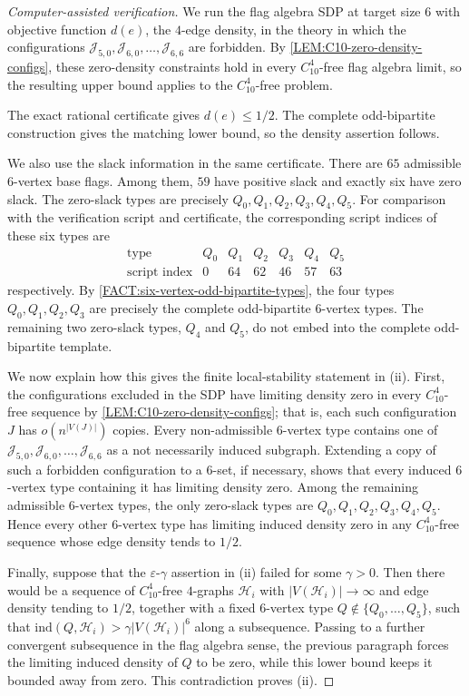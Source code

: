 \documentclass[10pt,a4paper]{article}
\theoremstyle{plain}
\theoremstyle{definition}
\newcommand{\ind}{\mathrm{ind}}
\begin{document}
\begin{proof}[Computer-assisted verification]
We run the flag algebra SDP at target size $6$ with objective function $d(e)$, the $4$-edge density, in the theory in which the configurations $\mathcal J_{5,0}, \mathcal J_{6,0},\ldots,\mathcal J_{6,6}$ are forbidden.  By \cref{LEM:C10-zero-density-configs}, these zero-density constraints hold in every $C_{10}^4$-free flag algebra limit, so the resulting upper bound applies to the $C_{10}^4$-free problem.

The exact rational certificate gives $d(e) \le 1/2$.
The complete odd-bipartite construction gives the matching lower bound, so the density assertion follows.

We also use the slack information in the same certificate.  There are $65$ admissible $6$-vertex base flags.  Among them, $59$ have positive slack and exactly six have zero slack.  The zero-slack types are precisely
$Q_0,Q_1,Q_2,Q_3,Q_4,Q_5$.
For comparison with the verification script and certificate, the corresponding script indices of these six types are
\[
\begin{array}{c|cccccc}
\text{type} & Q_0 & Q_1 & Q_2 & Q_3 & Q_4 & Q_5\\
\hline
\text{script index} & 0 & 64 & 62 & 46 & 57 & 63
\end{array}
\]
respectively.
By \cref{FACT:six-vertex-odd-bipartite-types}, the four types $Q_0,Q_1,Q_2,Q_3$ are precisely the complete odd-bipartite $6$-vertex types.
The remaining two zero-slack types, $Q_4$ and $Q_5$, do not embed into the complete odd-bipartite template.

We now explain how this gives the finite local-stability statement in \textup{(ii)}.  First, the configurations excluded in the SDP have limiting density zero in every $C_{10}^4$-free sequence by \cref{LEM:C10-zero-density-configs}; that is, each such configuration $J$ has $o(n^{|V(J)|})$ copies.  Every non-admissible $6$-vertex type contains one of $\mathcal J_{5,0},\mathcal J_{6,0},\ldots,\mathcal J_{6,6}$ as a not necessarily induced subgraph.  Extending a copy of such a forbidden configuration to a $6$-set, if necessary, shows that every induced $6$-vertex type containing it has limiting density zero.  Among the remaining admissible $6$-vertex types, the only zero-slack types are $Q_0,Q_1,Q_2,Q_3,Q_4,Q_5$.  Hence every other $6$-vertex type has limiting induced density zero in any $C_{10}^4$-free sequence whose edge density tends to $1/2$.

Finally, suppose that the $\varepsilon$-$\gamma$ assertion in \textup{(ii)} failed for some $\gamma>0$.  Then there would be a sequence of $C_{10}^4$-free $4$-graphs $\mathcal H_i$ with $|V(\mathcal H_i)|\to\infty$ and edge density tending to $1/2$, together with a fixed $6$-vertex type $Q\notin\{Q_0,\ldots,Q_5\}$, such that $\ind(Q,\mathcal H_i)>\gamma |V(\mathcal H_i)|^6$ along a subsequence.  Passing to a further convergent subsequence in the flag algebra sense, the previous paragraph forces the limiting induced density of $Q$ to be zero, while this lower bound keeps it bounded away from zero.  This contradiction proves \textup{(ii)}.
\end{proof}
\end{document}
